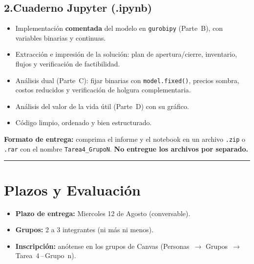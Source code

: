 \documentclass[12pt,a4paper]{article}
\begin{document}
\subsection*{2.\quad Cuaderno Jupyter (.ipynb)}

\begin{itemize}[topsep=2pt]
    \item Implementación \textbf{comentada} del modelo en \texttt{gurobipy}
          (Parte~B), con variables binarias y continuas.
    \item Extracción e impresión de la solución: plan de apertura/cierre,
          inventario, flujos y verificación de factibilidad.
    \item Análisis dual (Parte~C): fijar binarias con \texttt{model.fixed()},
          precios sombra, costos reducidos y verificación de holgura complementaria.
    \item Análisis del valor de la vida útil (Parte~D) con su gráfico.
    \item Código limpio, ordenado y bien estructurado.
\end{itemize}

\medskip
\noindent\textbf{Formato de entrega:} comprima el informe y el notebook en un
archivo \texttt{.zip} o \texttt{.rar} con el nombre \texttt{Tarea4\_GrupoN}.
\textbf{No entregue los archivos por separado.}

\noindent\rule{\linewidth}{0.4pt}

\section*{Plazos y Evaluación}

\begin{itemize}[topsep=2pt]
    \item \textbf{Plazo de entrega:} Miercoles 12 de Agosto (conversable).
    \item \textbf{Grupos:} 2 a 3 integrantes (ni más ni menos).
    \item \textbf{Inscripción:} anótense en los grupos de Canvas
          (Personas~$\to$ Grupos~$\to$ Tarea~4\,--\,Grupo~n).
\end{itemize}

\vspace{0.5em}
\end{document}
